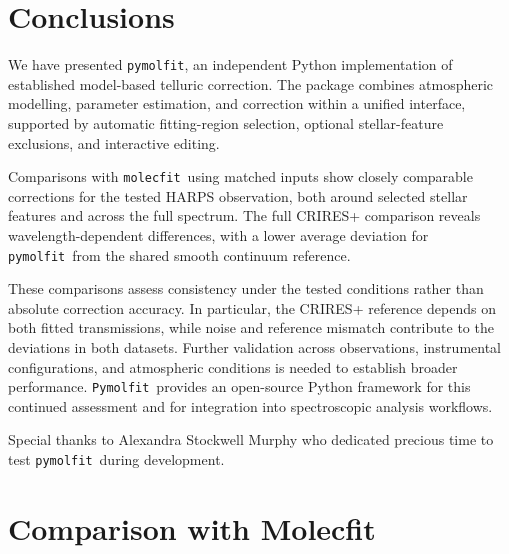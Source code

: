 \documentclass{aa}
\newcommand{\molecfit}{{\texttt{molecfit}}}
\newcommand{\Pymolfit}{\texttt{Pymolfit}}
\newcommand{\pymolfit}{\texttt{pymolfit}}
\begin{document}
\section{Conclusions}

We have presented \pymolfit, an independent Python implementation of established model-based telluric correction. The package combines atmospheric modelling, parameter estimation, and correction within a unified interface, supported by automatic fitting-region selection, optional stellar-feature exclusions, and interactive editing.

Comparisons with \molecfit\ using matched inputs show closely comparable corrections for the tested HARPS observation, both around selected stellar features and across the full spectrum. The full CRIRES+ comparison reveals wavelength-dependent differences, with a lower average deviation for \pymolfit\ from the shared smooth continuum reference.

These comparisons assess consistency under the tested conditions rather than absolute correction accuracy. In particular, the CRIRES+ reference depends on both fitted transmissions, while noise and reference mismatch contribute to the deviations in both datasets. Further validation across observations, instrumental configurations, and atmospheric conditions is needed to establish broader performance. \Pymolfit\ provides an open-source Python framework for this continued assessment and for integration into spectroscopic analysis workflows.

\begin{acknowledgements}
Special thanks to Alexandra Stockwell Murphy who dedicated precious time to test \pymolfit\ during development. 
\end{acknowledgements}
%




\appendix
\onecolumn
\section{Comparison with Molecfit}
\end{document}
